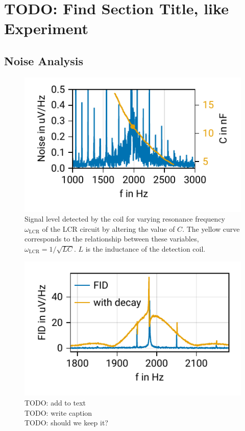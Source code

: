 \documentclass[
    parskip=half, 
    twoside=false,
    twocolumn=true,
    fontsize=11pt,
]{scrarticle}
\begin{document}
\section{TODO: Find Section Title, like Experiment}
\subsection{Noise Analysis}
\begin{figure}
    \centering
    \includegraphics{figures/01 noise.pdf}
    \caption{Signal level detected by the coil for varying resonance frequency $\omega_{\text{LCR}}$ of the LCR circuit by altering the value of $C$. The yellow curve corresponds to the relationship between these variables, $\omega_{\text{LCR}} = 1/\sqrt{LC}$. $L$ is the inductance of the detection coil.}
    \label{fig:tune_C}
\end{figure}
\begin{figure}
    \centering
    \includegraphics{figures/09 resonance.pdf}
    \caption{
        TODO: add to text\\
        TODO: write caption\\
        TODO: should we keep it?
    }
\end{figure}
\end{document}

